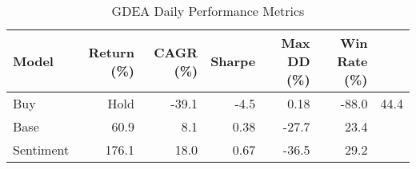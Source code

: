 \begin{table}[h]
\centering
\caption{GDEA Daily Performance Metrics}
\begin{tabular}{lrrrrr}
\hline
Model & Return (\%) & CAGR (\%) & Sharpe & Max DD (\%) & Win Rate (\%) \\
\hline
Buy&Hold & -39.1 & -4.5 & 0.18 & -88.0 & 44.4 \\
Base & 60.9 & 8.1 & 0.38 & -27.7 & 23.4 \\
Sentiment & 176.1 & 18.0 & 0.67 & -36.5 & 29.2 \\
\hline
\end{tabular}
\end{table}